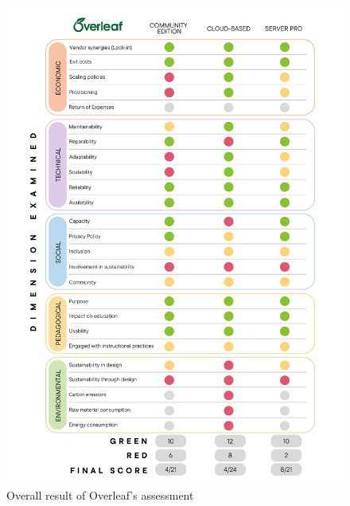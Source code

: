 \begin{figure}[ht!]
    \centering
    \includegraphics[width=1\textwidth]{attachments/overleaf_result_overview.pdf}
    \caption{Overall result of Overleaf's assessment}
    \label{fig:overleaf_result_overview}
\end{figure}


